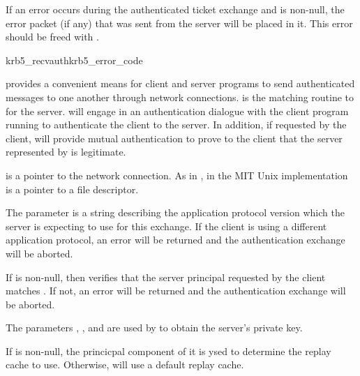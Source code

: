 If an error occurs during the authenticated ticket exchange and
 is non-null, the error packet (if any) that was sent
from the server will be placed in it.  This error should be freed with
.

\begin{funcdecl}{krb5_recvauth}{krb5_error_code}{\funcinout}
\funcin
{}
\funcout
{}
\end{funcdecl}

 provides a convenient means for client and
server programs to send authenticated messages to one another through
network connections.   is the matching routine
to  for the server.  
will engage in an authentication dialogue with the
client program running  to authenticate the
client to the server.  In addition, if requested by the client,
 will provide mutual authentication to
prove to the client that the server represented by
 is legitimate. 

 is a pointer to the network connection.  As in
, in the MIT Unix implementation
 is a pointer to a file descriptor.

The parameter  is a string describing the
application protocol version which the server is expecting to use for
this exchange.  If the client is using a different application protocol,
an error will be returned and the authentication exchange will be
aborted.

If  is non-null, then 
verifies that the server principal requested by the client matches
.  If not, an error will be returned and the
authentication exchange will be aborted.

The parameters , ,
and  are used by  to obtain the
server's private key.

If  is non-null, the princicpal component of it is
ysed to determine the replay cache to use. Otherwise,
 will use a default replay cache.

